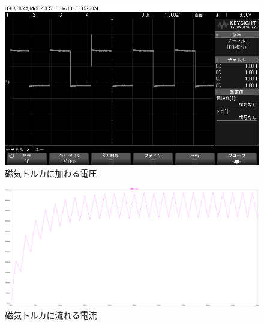 \begin{figure}[H]
	\centering
		\includegraphics[scale=0.3]{./figure/scope_11.png}
		\caption{磁気トルカに加わる電圧}
		\label{fig:osiro2}
\end{figure}

\begin{figure}[H]
	\centering
		\includegraphics[scale=0.3]{./figure/50current.png}
		\caption{磁気トルカに流れる電流}
		\label{fig:current50}
\end{figure}

